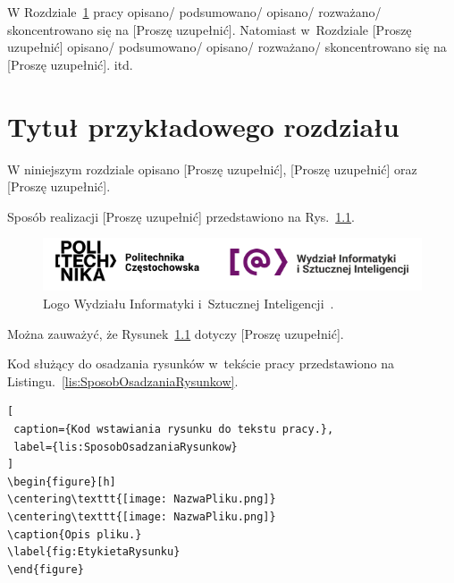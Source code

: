 \documentclass{PracaDyplomowa-Szablon}
\begin{document}
W Rozdziale~\ref{cha:RozdzialWprowadzajacy} pracy opisano/ podsumowano/ opisano/ rozważano/ skoncentrowano się na [Proszę uzupełnić]. Natomiast w~Rozdziale [Proszę uzupełnić] opisano/ podsumowano/ opisano/ rozważano/ skoncentrowano się na [Proszę uzupełnić]. itd.

\cleardoublepage

\chapter{Tytuł przykładowego rozdziału}
\label{cha:RozdzialWprowadzajacy}


W niniejszym rozdziale opisano [Proszę uzupełnić], [Proszę uzupełnić] oraz [Proszę uzupełnić].

Sposób realizacji [Proszę uzupełnić] przedstawiono na Rys.~\ref{fig:LogoWIiSI}.

\begin{figure}[h]
\centering\includegraphics[width=15cm]{fig_LogoWIiSI.png}
\caption{Logo Wydziału Informatyki i~Sztucznej Inteligencji~\cite{bib:LogoWIMiI}.}
\label{fig:LogoWIiSI}
\end{figure}

\noindent Można zauważyć, że Rysunek~\ref{fig:LogoWIiSI} dotyczy [Proszę uzupełnić].

Kod służący do osadzania rysunków w~tekście pracy przedstawiono na Listingu.~\ref{lis:SposobOsadzaniaRysunkow}.

\begin{lstlisting}[
 caption={Kod wstawiania rysunku do tekstu pracy.},
 label={lis:SposobOsadzaniaRysunkow}
]
\begin{figure}[h]
\centering\texttt{[image: NazwaPliku.png]}
\centering\texttt{[image: NazwaPliku.png]}
\caption{Opis pliku.}
\label{fig:EtykietaRysunku}
\end{figure}
\end{lstlisting}
\end{document}
